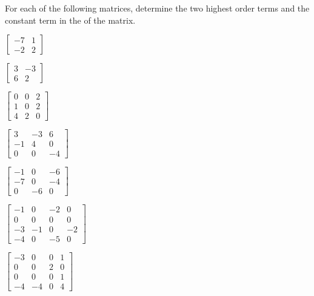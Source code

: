 \begin{exercise} \label{ex:} 
For each of the following matrices, determine the two highest order terms and the constant term in the  of the matrix.
\begin{parts}
\item \(\begin{bmatrix} -7 & 1
\\-2 & 2 \end{bmatrix}\)

\item \(\begin{bmatrix} 3 & -3
\\6 & 2 \end{bmatrix}\)

\item \(\begin{bmatrix} 0 & 0 & 2
\\1 & 0 & 2
\\4 & 2 & 0 \end{bmatrix}\)

\item \(\begin{bmatrix} 3 & -3 & 6
\\-1 & 4 & 0
\\0 & 0 & -4 \end{bmatrix}\)

\item \(\begin{bmatrix} -1 & 0 & -6
\\-7 & 0 & -4
\\0 & -6 & 0 \end{bmatrix}\)

\item \(\begin{bmatrix} -1 & 0 & -2 & 0
\\0 & 0 & 0 & 0
\\-3 & -1 & 0 & -2
\\-4 & 0 & -5 & 0 \end{bmatrix}\)

\item \(\begin{bmatrix} -3 & 0 & 0 & 1
\\0 & 0 & 2 & 0
\\0 & 0 & 0 & 1
\\-4 & -4 & 0 & 4 \end{bmatrix}\)


\end{parts}
\end{exercise}
